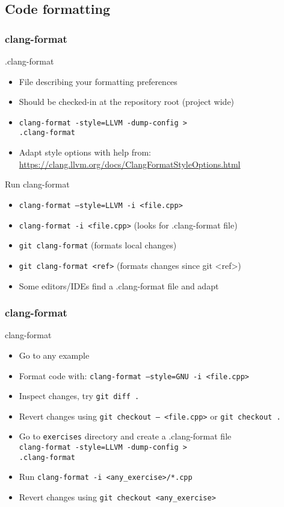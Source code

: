 \subsection[format]{Code formatting}

\begin{frame}[fragile]
\frametitle{clang-format}
\begin{block}{.clang-format}
	\begin{itemize}
		\item File describing your formatting preferences
		\item Should be checked-in at the repository root (project wide)
		\item \texttt{clang-format -style=LLVM -dump-config >} \\
		  \texttt{.clang-format}
		\item Adapt style options with help from: \url{https://clang.llvm.org/docs/ClangFormatStyleOptions.html}
	\end{itemize}
\end{block}
\begin{block}{Run clang-format}
	\begin{itemize}
		\item \texttt{clang-format --style=LLVM -i <file.cpp>}
		\item \texttt{clang-format -i <file.cpp>} (looks for .clang-format file)
		\item \texttt{git clang-format} (formats local changes)
		\item \texttt{git clang-format <ref>} (formats changes since git \textless{}ref\textgreater{})
		\item Some editors/IDEs find a .clang-format file and adapt
	\end{itemize}
\end{block}
\end{frame}

\begin{frame}[fragile]
\frametitle{clang-format}
\begin{exercise}{clang-format}
	\begin{itemize}
		\item Go to any example
		\item Format code with: \texttt{clang-format --style=GNU -i <file.cpp>}
		\item Inspect changes, try \texttt{git diff .}
		\item Revert changes using \texttt{git checkout -- <file.cpp>} or \texttt{git checkout .}
		\item Go to \texttt{exercises} directory and create a .clang-format file \\
		  \texttt{clang-format -style=LLVM -dump-config >} \\
		  \texttt{.clang-format}
		\item Run \texttt{clang-format -i <any_exercise>/*.cpp}
		\item Revert changes using \texttt{git checkout <any_exercise>}
	\end{itemize}
\end{exercise}
\end{frame}
